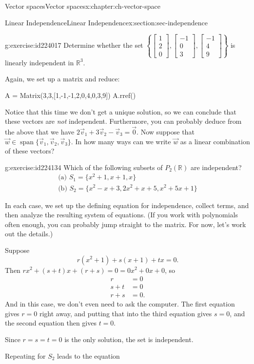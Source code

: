 \documentclass[oneside,10pt,]{book}
\numberwithin{equation}{section}
\newcommand{\spn}{\operatorname{span}}
\newcommand{\bbm}{\begin{bmatrix}}
\newcommand{\ebm}{\end{bmatrix}}
\newcommand{\R}{\mathbb{R}}
\newcommand{\amp}{&}
\begin{document}
\begin{chapterptx}{Vector spaces}{}{Vector spaces}{}{}{x:chapter:ch-vector-space}
\begin{sectionptx}{Linear Independence}{}{Linear Independence}{}{}{x:section:sec-independence}
\begin{inlineexercise}{}{g:exercise:id224017}
Determine whether the set \(\left\{\bbm 1\\2\\0\ebm, \bbm -1\\0\\3\ebm,\bbm -1\\4\\9\ebm\right\}\) is linearly independent in \(\R^3\).%
\end{inlineexercise}
Again, we set up a matrix and reduce:%
\begin{sageinput}
A = Matrix(3,3,[1,-1,-1,2,0,4,0,3,9])
A.rref()
\end{sageinput}
Notice that this time we don't get a unique solution, so we can conclude that these vectors are \emph{not} independent. Furthermore, you can probably deduce from the above that we have \(2\vec{v}_1+3\vec{v}_2-\vec{v}_3=\vec{0}\). Now suppose that \(\vec{w}\in\spn\{\vec{v}_1,\vec{v}_2,\vec{v}_3\}\). In how many ways can we write \(\vec{w}\) as a linear combination of these vectors?%
\begin{inlineexercise}{}{g:exercise:id224134}%
Which of the following subsets of \(P_2(\mathbb{R})\) are independent?%
\begin{gather*}
\text{(a) } S_1 = \{x^2+1, x+1, x\}\\
\text{(b) } S_2 = \{x^2-x+3, 2x^2+x+5, x^2+5x+1\}
\end{gather*}
%
\end{inlineexercise}
In each case, we set up the defining equation for independence, collect terms, and then analyze the resulting system of equations. (If you work with polynomials often enough, you can probably jump straight to the matrix. For now, let's work out the details.)%
\par
Suppose%
\begin{equation*}
r(x^2+1)+s(x+1)+tx = 0\text{.}
\end{equation*}
Then \(rx^2+(s+t)x+(r+s)=0=0x^2+0x+0\), so%
\begin{align*}
r \amp =0\\
s+t \amp =0\\
r+s\amp =0\text{.}
\end{align*}
And in this case, we don't even need to ask the computer. The first equation gives \(r=0\) right away, and putting that into the third equation gives \(s=0\), and the second equation then gives \(t=0\).%
\par
Since \(r=s=t=0\) is the only solution, the set is independent.%
\par
Repeating for \(S_2\) leads to the equation%

\end{sectionptx}
\end{chapterptx}
\end{document}
